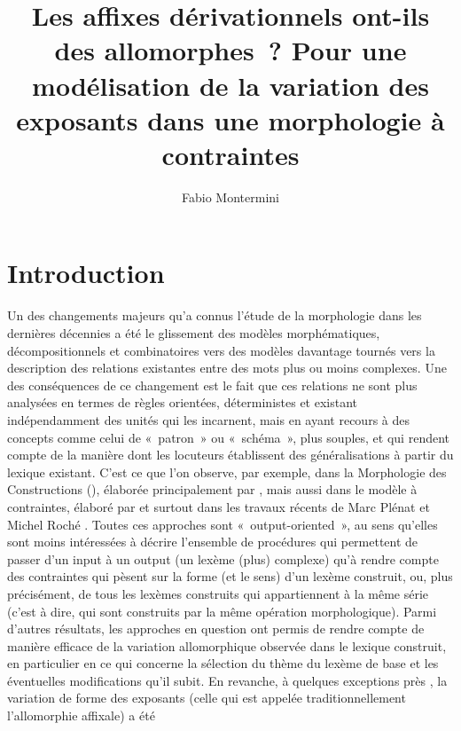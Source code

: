 \documentclass[output=paper]{langsci/langscibook}
\title{Les affixes dérivationnels ont-ils des allomorphes~? Pour une modélisation de la variation des exposants dans une morphologie à contraintes}
\author{Fabio Montermini \affiliation{CLLE-ERSS, CNRS \& Université de Toulouse 2 Jean Jaurès} }
\begin{document}

\section{Introduction}

Un des changements majeurs qu'a connus l'étude de la morphologie dans
les dernières décennies a été le glissement des modèles morphématiques,
décompositionnels et combinatoires vers des modèles davantage tournés
vers la description des relations existantes entre des mots plus ou
moins complexes. Une des conséquences de ce changement est le fait que
ces relations ne sont plus analysées en termes de règles orientées,
déterministes et existant indépendamment des unités qui les incarnent,
mais en ayant recours à des concepts comme celui de «~patron~» ou
«~schéma~», plus souples, et qui rendent compte de la manière dont les
locuteurs établissent des généralisations à partir du lexique existant.
C'est ce que l'on observe, par exemple, dans la Morphologie des
Constructions (), élaborée principalement par
%
\citet{Booij10}%
%
, mais aussi dans le modèle à contraintes, élaboré par
%
\citet{Hathout2009a} %
%
et surtout dans les travaux récents de Marc Plénat et
Michel Roché %
\citep{Plenat-Roche2014,roche2014.CMLF,Roche16}%
%
. Toutes
ces approches sont «~output-oriented~», au sens qu'elles sont moins
intéressées à décrire l'ensemble de procédures qui permettent de passer
d'un input à un output (un lexème (plus) complexe) qu'à rendre compte
des contraintes qui pèsent sur la forme (et le sens) d'un lexème
construit, ou, plus précisément, de tous les lexèmes construits qui
appartiennent à la même série (c'est à dire, qui sont construits par la même opération
morphologique). Parmi d'autres résultats, les approches en question ont
permis de rendre compte de manière efficace de la variation
allomorphique observée dans le lexique construit, en particulier en ce
qui concerne la sélection du thème du lexème de base et les éventuelles
modifications qu'il subit. En revanche, à quelques exceptions près
%
\citep[notamment][]{LignonStephanie2011}%
%
, la variation de forme des exposants
(celle qui est appelée traditionnellement l'allomorphie affixale) a été
\end{document}
